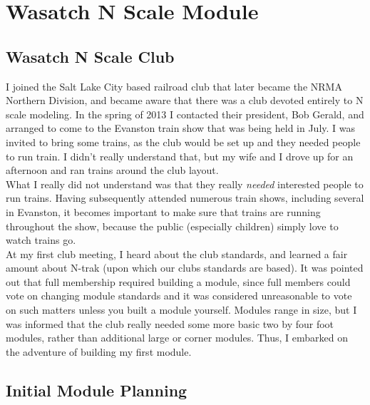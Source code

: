 %



\chapter{Wasatch N Scale Module}
\minitoc
\section{Wasatch N Scale Club}
I joined the Salt Lake City based railroad club that later became the NRMA Northern Division, and became aware that there was
a club devoted entirely to N scale modeling.  In the spring of 2013 I contacted their president, Bob Gerald, and arranged to come to the Evanston train show that was being held in July.  I was invited to bring some trains, as the club would be set up and they needed people to run train.  I didn't really understand that, but my wife and I drove up for an afternoon and ran trains around the club layout.\\

What I really did not understand was that they really \emph{needed} interested people to run trains.  Having subsequently attended numerous train shows, including several in Evanston, it becomes important to make sure that trains are running throughout the show, because the public (especially children) simply love to watch trains go.\\

At my first club meeting, I heard about the club standards, and learned a fair amount about N-trak (upon which our clubs standards are based).  It was pointed out that full membership required building a module, since full members could vote on changing module standards and it was considered unreasonable to vote on such matters unless you built a module yourself.  Modules range in size, but I was informed that the club really needed some more basic two by four foot modules, rather than additional large or corner modules.  Thus, I embarked on the adventure of building my first module.

\section{Initial Module Planning}


